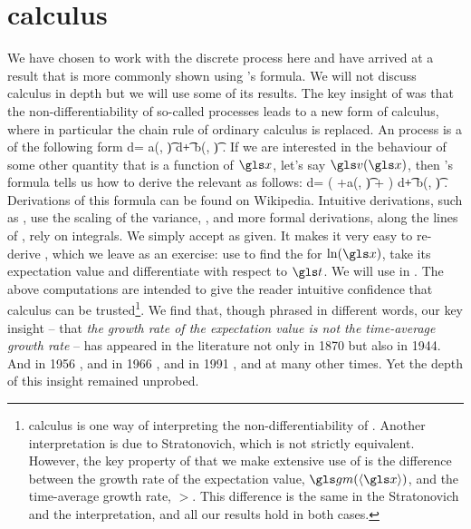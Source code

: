 \section{\Ito calculus}
We have chosen to work with the discrete process here and have arrived at a result that is more
commonly shown using \Ito's formula. We will not discuss \Ito calculus in depth 
but we will use some of its results. The key insight of \Ito was that the non-differentiability
of so-called \Ito processes leads to a new form of calculus, where in particular the chain rule of
ordinary calculus is replaced.
An \Ito process is a \SDE of the following form
\be
d\x = a(\x, \t) d\t + b(\x, \t) \gd\gW.
\ee
If we are interested in the behaviour of some other quantity that is a 
function of $\x$, let's say $\gv(\x)$, then \Ito's formula tells us how to derive
the relevant \SDE as follows:
\be
d\gv =  \left(\frac{\partial \gv}{\partial\t} +a(\x, \t)\frac{\partial \gv}{\partial\x} +  \right) d\t + b(\x, \t) \frac{\partial \gv}{\partial\x} \gd\gW.
\ee
Derivations of this formula can be found on Wikipedia. Intuitive derivations, such as \cite{Hull2006}, use the 
scaling of the variance, , and more formal 
derivations, along the lines of \cite{Harrison2013}, rely on integrals.
We simply accept  as given. It makes it very easy to re-derive , which we leave as an exercise:
use  to find the \SDE for $\ln(\x)$, take its expectation value and differentiate with respect to $\t$. 
We will use  in . The above computations are intended to 
give the reader intuitive confidence that \Ito calculus can be 
trusted\footnote{\Ito calculus is one way of interpreting the non-differentiability of \gd\gW. Another interpretation
is due to Stratonovich, which is not strictly equivalent. However, the key property of \GBM that we make
extensive use of is the difference between the growth rate of the expectation value, $\gm(\ave{\x})$, and the
time-average growth rate, $\gt$. This difference is the same in the Stratonovich and the \Ito interpretation, and all our results hold in both cases.}. 
We find that, though phrased in different words, our key insight -- that {\it the growth rate of the expectation value is not the time-average
growth rate} -- has appeared in the literature not only in 1870 but also in 1944.
And in 1956 \cite{Kelly1956}, and in 1966 \cite{Thorp1966}, and in 1991 \cite{CoverThomas1991}, and at many other times. 
Yet the depth of this insight remained unprobed.

